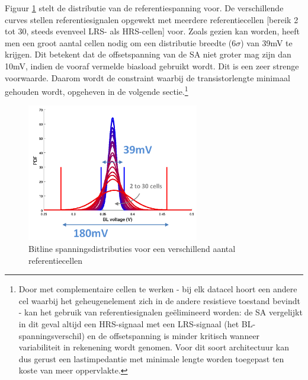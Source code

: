 Figuur \ref{fig:distref} stelt de distributie van de referentiespanning voor. De verschillende curves stellen referentiesignalen opgewekt met meerdere referentiecellen [bereik 2 tot 30, steeds evenveel LRS- als HRS-cellen] voor. Zoals gezien kan worden, heeft men een groot aantal cellen nodig om een distributie breedte (6$\sigma$) van 39mV te krijgen. Dit betekent dat de offsetspanning van de SA niet groter mag zijn dan 10mV, indien de vooraf vermelde biasload gebruikt wordt. Dit is een zeer strenge voorwaarde. Daarom wordt de constraint waarbij de transistorlengte minimaal gehouden wordt, opgeheven in de volgende sectie.\footnote{Door met complementaire cellen te werken - bij elk datacel hoort een andere cel waarbij het geheugenelement zich in de andere resistieve toestand bevindt - kan het gebruik van referentiesignalen geëlimineerd worden: de SA vergelijkt in dit geval altijd een HRS-signaal met een LRS-signaal (het BL-spanningsverschil) en de offsetspanning is minder kritisch wanneer variabiliteit in rekenening wordt genomen. Voor dit soort architectuur kan dus gerust een lastimpedantie met minimale lengte worden toegepast ten koste van meer oppervlakte.}

\begin{figure}[!ht]
  \centering
  \includegraphics[width=0.67\textwidth]{../fig/hfdst-last-ref.png}
  \caption[Bitlinespanning referentiecellen]{Bitline spanningsdistributies voor een verschillend aantal referentiecellen}
  \label{fig:distref}
\end{figure}


